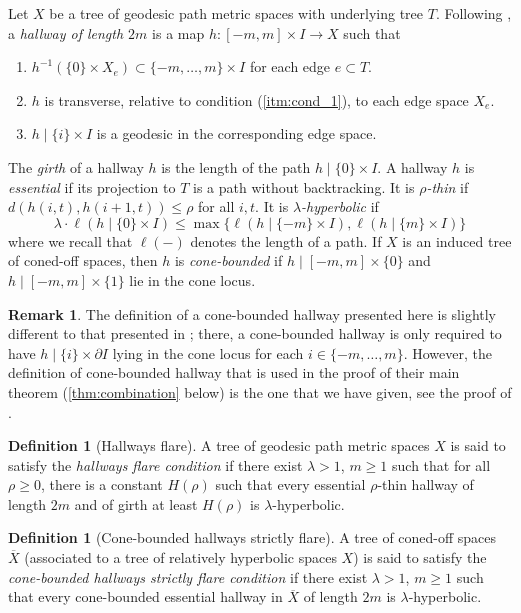 \documentclass[11pt, a4paper]{amsart}
\theoremstyle{definition}
\newtheorem{definition}[theorem]{Definition}
\newtheorem{remark}[theorem]{Remark}
\DeclareMathOperator{\len}{\ell}
\begin{document}
Let $X$ be a tree of geodesic path metric spaces with underlying tree $T$. Following \cite{BF92}, a \emph{hallway of length $2m$} is a map $h\colon [-m, m]\times I\to X$ such that
\begin{enumerate}
\item\label{itm:cond_1} $h^{-1}(\{0\}\times X_e)\subset \{-m, \ldots, m\}\times I$ for each edge $e\subset T$.
\item $h$ is transverse, relative to condition (\ref{itm:cond_1}), to each edge space $X_e$.
\item $h\mid\{i\}\times I$ is a geodesic in the corresponding edge space.
\end{enumerate}
The \emph{girth} of a hallway $h$ is the length of the path $h\mid\{0\}\times I$. A hallway $h$ is \emph{essential} if its projection to $T$ is a path without backtracking. It is \emph{$\rho$-thin} if $d(h(i, t), h(i+1, t))\leqslant \rho$ for all $i, t$. It is \emph{$\lambda$-hyperbolic} if 
\[
\lambda\cdot \len(h\mid \{0\}\times I) \leqslant \max{\{\len(h\mid \{-m\}\times I), \len(h\mid\{m\}\times I)\}}
\]
where we recall that $\len(-)$ denotes the length of a path. If $X$ is an induced tree of coned-off spaces, then $h$ is \emph{cone-bounded} if $h\mid [-m, m]\times\{0\}$ and $h\mid[-m, m]\times\{1\}$ lie in the cone locus.

\begin{remark}
The definition of a cone-bounded hallway presented here is slightly different to that presented in \cite{MR08}; there, a cone-bounded hallway is only required to have $h\mid\{i\}\times\partial I$ lying in the cone locus for each $i\in \{-m, \ldots, m\}$. However, the definition of cone-bounded hallway that is used in the proof of their main theorem (\cref{thm:combination} below) is the one that we have given, see the proof of \cite[Proposition 4.4]{MR08}.
\end{remark}

\begin{definition}[Hallways flare]
A tree of geodesic path metric spaces $X$ is said to satisfy the \emph{hallways flare condition} if there exist $\lambda>1$, $m\geqslant 1$ such that for all $\rho\geqslant 0$, there is a constant $H(\rho)$ such that every essential $\rho$-thin hallway of length $2m$ and of girth at least $H(\rho)$ is $\lambda$-hyperbolic.
\end{definition}

\begin{definition}[Cone-bounded hallways strictly flare]
A tree of coned-off spaces $\overline{X}$ (associated to a tree of relatively hyperbolic spaces $X$) is said to satisfy the \emph{cone-bounded hallways strictly flare condition} if there exist $\lambda>1$, $m\geqslant 1$ such that every cone-bounded essential hallway in $\overline{X}$ of length $2m$ is $\lambda$-hyperbolic.
\end{definition}
\end{document}
